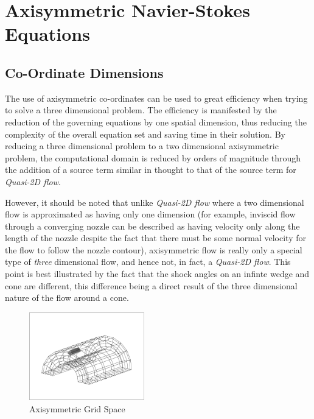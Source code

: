\section{Axisymmetric Navier-Stokes Equations}
\subsection{Co-Ordinate Dimensions}

The use of axisymmetric co-ordinates can be used to great efficiency
when trying to solve a three dimensional problem.  The efficiency is manifested
by the reduction of the governing equations by one spatial dimension, thus 
reducing the complexity of the overall equation set and saving time in their 
solution.  By reducing a three dimensional problem to a two dimensional axisymmetric
problem, the computational domain is reduced by orders of magnitude through the 
addition of a source term similar in thought to that of the source 
term for \emph{Quasi-2D flow}.  

However, it should be noted that unlike \emph{Quasi-2D flow} 
where a two dimensional flow is approximated as having only one dimension (for example, 
inviscid flow through a converging nozzle can be described as having velocity only along the 
length of the nozzle despite the fact that there must be some normal velocity for the flow
to follow the nozzle contour), axisymmetric flow is really only a special type of \emph{three}
dimensional flow, and hence not, in fact, a \emph{Quasi-2D flow}.  This point is best 
illustrated by the fact that the shock angles on an infinte wedge and cone are different, this 
difference being a direct result of the three dimensional nature of the flow around a cone.

\begin{figure}[h]
\begin{center}
\includegraphics[width=5cm]{./cyl_grid.eps}
\caption{Axisymmetric Grid Space}
\label{fig:grid}
\end{center}
\end{figure}

